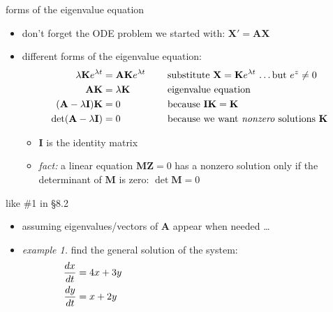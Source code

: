 \documentclass[urlcolor=blue,dvipsnames]{beamer}
\newcommand{\bA}{\mathbf{A}}
\newcommand{\bI}{\mathbf{I}}
\newcommand{\bK}{\mathbf{K}}
\newcommand{\bM}{\mathbf{M}}
\newcommand{\bX}{\mathbf{X}}
\newcommand{\bZ}{\mathbf{Z}}
\begin{document}
\begin{frame}{forms of the eigenvalue equation}

\begin{itemize}
\medskip
\item don't forget the ODE problem we started with: \quad $\bX' = \bA \bX$

\bigskip
\item different forms of the eigenvalue equation:
\begin{align*}
\lambda \bK e^{\lambda t} &= \bA \bK e^{\lambda t} & &\text{substitute $\bX=\bK e^{\lambda t}$ \dots but $e^z\ne 0$} \\
\bA \bK &= \lambda \bK\hspace{10mm} & &\text{eigenvalue equation} \\
(\bA - \lambda \bI)\bK &= 0 & &\text{because $\bI\bK = \bK$} \\
\det(\bA - \lambda \bI) &= 0 & &\text{because we want \emph{nonzero} solutions $\bK$}
\end{align*}

    \begin{itemize}
    \item $\bI$ is the identity matrix
    \item \emph{fact:} a linear equation $\bM \bZ = 0$ has a nonzero solution only if the determinant of $\bM$ is zero: \qquad $\det \bM=0$
    \end{itemize}
\end{itemize}
\end{frame}


\begin{frame}{like \#1 in \S8.2}

\begin{itemize}
\item assuming eigenvalues/vectors of $\bA$ appear when needed \dots
\item \emph{example 1.}  find the general solution of the system:
\begin{align*}
\frac{dx}{dt} &= 4x + 3y \hspace{70mm} \\
\frac{dy}{dt} &= x + 2y
\end{align*}
\end{itemize}

\vspace{45mm}
\end{frame}
\end{document}
